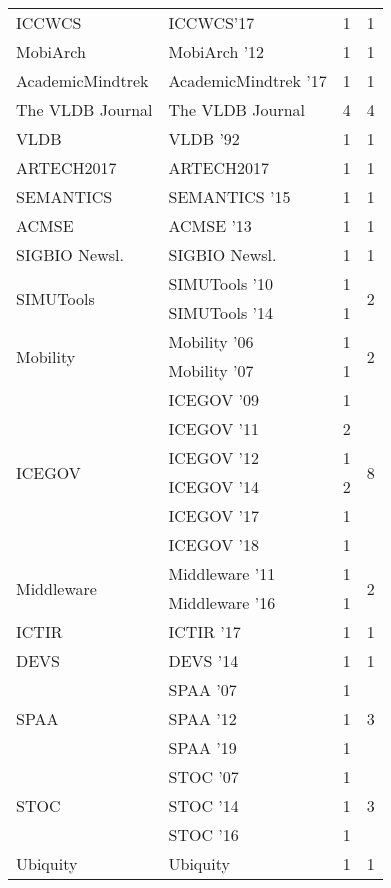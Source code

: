 \begin{table*}[t]
\begin{tabular}{llrr}
\multirow{1}{*}{ICCWCS} & ICCWCS'17 & 1 & \multirow{1}{*}{1}\\
\multirow{1}{*}{MobiArch } & MobiArch '12 & 1 & \multirow{1}{*}{1}\\
\multirow{1}{*}{AcademicMindtrek } & AcademicMindtrek '17 & 1 & \multirow{1}{*}{1}\\
\multirow{1}{*}{The VLDB Journal} & The VLDB Journal & 4 & \multirow{1}{*}{4}\\
\multirow{1}{*}{VLDB } & VLDB '92 & 1 & \multirow{1}{*}{1}\\
\multirow{1}{*}{ARTECH2017} & ARTECH2017 & 1 & \multirow{1}{*}{1}\\
\multirow{1}{*}{SEMANTICS } & SEMANTICS '15 & 1 & \multirow{1}{*}{1}\\
\multirow{1}{*}{ACMSE } & ACMSE '13 & 1 & \multirow{1}{*}{1}\\
\multirow{1}{*}{SIGBIO Newsl.} & SIGBIO Newsl. & 1 & \multirow{1}{*}{1}\\
\multirow{2}{*}{SIMUTools } & SIMUTools '10 & 1 & \multirow{2}{*}{2}\\
& SIMUTools '14 & 1 &\\
\multirow{2}{*}{Mobility } & Mobility '06 & 1 & \multirow{2}{*}{2}\\
& Mobility '07 & 1 &\\
\multirow{6}{*}{ICEGOV } & ICEGOV '09 & 1 & \multirow{6}{*}{8}\\
& ICEGOV '11 & 2 &\\
& ICEGOV '12 & 1 &\\
& ICEGOV '14 & 2 &\\
& ICEGOV '17 & 1 &\\
& ICEGOV '18 & 1 &\\
\multirow{2}{*}{Middleware } & Middleware '11 & 1 & \multirow{2}{*}{2}\\
& Middleware '16 & 1 &\\
\multirow{1}{*}{ICTIR } & ICTIR '17 & 1 & \multirow{1}{*}{1}\\
\multirow{1}{*}{DEVS } & DEVS '14 & 1 & \multirow{1}{*}{1}\\
\multirow{3}{*}{SPAA } & SPAA '07 & 1 & \multirow{3}{*}{3}\\
& SPAA '12 & 1 &\\
& SPAA '19 & 1 &\\
\multirow{3}{*}{STOC } & STOC '07 & 1 & \multirow{3}{*}{3}\\
& STOC '14 & 1 &\\
& STOC '16 & 1 &\\
\multirow{1}{*}{Ubiquity} & Ubiquity & 1 & \multirow{1}{*}{1}\\

\end{tabular}
\end{table*}
